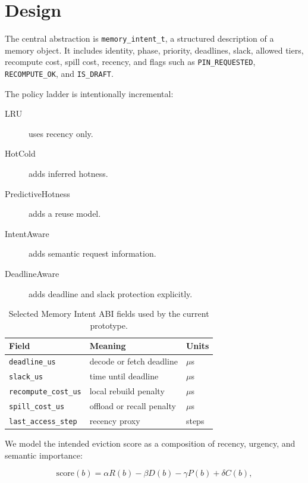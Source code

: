 \documentclass[10pt,twocolumn]{article}
\begin{document}
\section{Design}
\label{sec:design}

The central abstraction is \texttt{memory\_intent\_t}, a structured description of a memory object. It includes identity, phase, priority, deadlines, slack, allowed tiers, recompute cost, spill cost, recency, and flags such as \texttt{PIN\_REQUESTED}, \texttt{RECOMPUTE\_OK}, and \texttt{IS\_DRAFT}.

The policy ladder is intentionally incremental:

\begin{description}
  \item[LRU] uses recency only.
  \item[HotCold] adds inferred hotness.
  \item[PredictiveHotness] adds a reuse model.
  \item[IntentAware] adds semantic request information.
  \item[DeadlineAware] adds deadline and slack protection explicitly.
\end{description}

\begin{table}[t]
\centering
\caption{Selected Memory Intent ABI fields used by the current prototype.\protect\footnotemark}
\label{tab:abi}
\begin{tabular}{lll}
\toprule
Field & Meaning & Units \\
\midrule
\texttt{deadline\_us} & decode or fetch deadline & $\mu$s \\
\texttt{slack\_us} & time until deadline & $\mu$s \\
\texttt{recompute\_cost\_us} & local rebuild penalty & $\mu$s \\
\texttt{spill\_cost\_us} & offload or recall penalty & $\mu$s \\
\texttt{last\_access\_step} & recency proxy & steps \\
\bottomrule
\end{tabular}
\end{table}

We model the intended eviction score as a composition of recency, urgency, and semantic importance:

\begin{equation}
\label{eq:score}
\mathrm{score}(b) = \alpha R(b) - \beta D(b) - \gamma P(b) + \delta C(b),
\end{equation}
\end{document}
